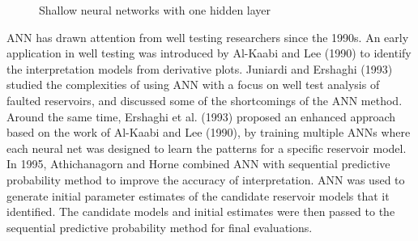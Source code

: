 \documentclass[english]{article}
\def\layersep{2.5cm}
\begin{document}
\begin{figure}[H]
\centering
{}
\centering
\caption{Shallow neural networks with one hidden layer}
\end{figure}
ANN has drawn attention from well testing researchers since the 1990s. An early application in well testing was introduced by Al-Kaabi and Lee (1990) to identify the interpretation models from derivative plots. Juniardi and Ershaghi (1993) studied the complexities of using ANN with a focus on well test analysis of faulted reservoirs, and discussed some of the shortcomings of the ANN method. Around the same time, Ershaghi et al. (1993) proposed an enhanced approach based on the work of Al-Kaabi and Lee (1990), by training multiple ANNs where each neural net was designed to learn the patterns for a specific reservoir model. In 1995, Athichanagorn and Horne combined ANN with sequential predictive probability method to improve the accuracy of interpretation. ANN was used to generate initial parameter estimates of the candidate reservoir models that it identified. The candidate models and initial estimates were then passed to the sequential predictive probability method for final evaluations.
\end{document}

